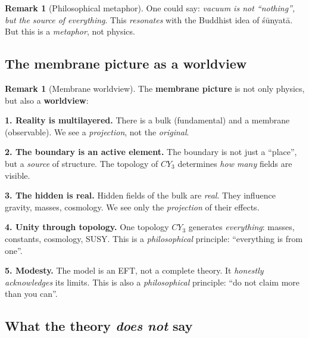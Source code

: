 \documentclass[11pt,a4paper]{article}
\newcommand{\CY}{CY_3}
\theoremstyle{definition}
\newtheorem{remark}[theorem]{Remark}
\begin{document}
\begin{remark}[Philosophical metaphor]
\label{rem:shunyata-metaphor}
One could say: \emph{vacuum is not ``nothing'', but the source of everything}. 
This \emph{resonates} with the Buddhist idea of śūnyatā. But this is a 
\emph{metaphor}, not physics.
\end{remark}

\subsection{The membrane picture as a worldview}
\label{subsec:membrane-worldview-phil}

\begin{remark}[Membrane worldview]
\label{rem:membrane-worldview-phil}
The \textbf{membrane picture} is not only physics, but also 
a \textbf{worldview}:

\medskip\noindent
\textbf{1. Reality is multilayered.}
There is a bulk (fundamental) and a membrane (observable). 
We see a \emph{projection}, not the \emph{original}.

\medskip\noindent
\textbf{2. The boundary is an active element.}
The boundary is not just a ``place'', but a \emph{source} of structure. 
The topology of $\CY$ determines \emph{how many} fields are visible.

\medskip\noindent
\textbf{3. The hidden is real.}
Hidden fields of the bulk are \emph{real}. They influence gravity, 
masses, cosmology. We see only the \emph{projection} of their effects.

\medskip\noindent
\textbf{4. Unity through topology.}
One topology $\CY$ generates \emph{everything}: masses, constants, 
cosmology, SUSY. This is a \emph{philosophical} principle: 
``everything is from one''.

\medskip\noindent
\textbf{5. Modesty.}
The model is an EFT, not a complete theory. It \emph{honestly acknowledges} 
its limits. This is also a \emph{philosophical} principle: 
``do not claim more than you can''.
\end{remark}

\subsection{What the theory \emph{does not} say}
\label{subsec:what-not-says}
\end{document}
